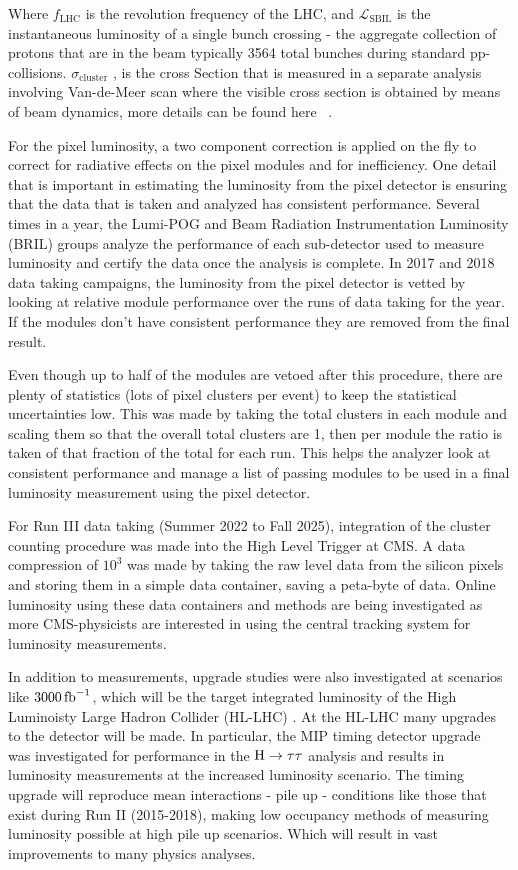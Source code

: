 Where $f_{\text{LHC}}$ is the revolution frequency of the LHC, and $\mathcal{L}_{\text{SBIL}}$ is the instantaneous luminosity of a single bunch crossing - the aggregate collection of protons that are in the beam typically 3564 total bunches during standard pp-collisions. $\sigma_{\text{cluster}}$ , is the cross Section that is measured in a separate analysis involving Van-de-Meer scan where the visible cross section is obtained by means of beam dynamics, more details can be found here ~\cite{Knolle:2792593}. 



For the pixel luminosity, a two component correction is applied on the fly to correct for radiative effects on the pixel modules and for inefficiency.  
One detail that is important in estimating the luminosity from the pixel detector is ensuring that the data that is taken and analyzed has consistent performance. Several times in a year, the Lumi-POG and Beam Radiation Instrumentation Luminosity (BRIL) groups analyze the performance of each sub-detector used to measure luminosity and certify the data once the analysis is complete. In 2017 and 2018 data taking campaigns, the luminosity from the pixel detector is vetted by looking at relative module performance over the runs of data taking for the year. If the modules don't have consistent performance they are removed from the final result. 

Even though up to half of the modules are vetoed after this procedure, there are plenty of statistics (lots of pixel clusters per event) to keep the statistical uncertainties low. 
This was made by taking the total clusters in each module and scaling them so that the overall total clusters are 1, then per module the ratio is taken of that fraction of the total for each run. This helps the analyzer look at consistent performance and manage a list of passing modules to be used in a final luminosity measurement using the pixel detector. 

For Run III data taking (Summer 2022 to Fall 2025), integration of the cluster counting procedure was made into the High Level Trigger at CMS. A data compression of $10^3$ was made by taking the raw level data from the silicon pixels and storing them in a simple data container, saving a peta-byte of data. Online luminosity using these data containers and methods are being investigated as more CMS-physicists are interested in using the central tracking system for luminosity measurements.

In addition to measurements,  upgrade studies were also investigated at scenarios like $3000 \mbox{\ensuremath{\,\text{fb}^\text{$-$1}}}$, which will be the target integrated luminosity of the High Luminoisty Large Hadron Collider (HL-LHC) . At the HL-LHC many upgrades to the detector will be made. In particular, the MIP timing detector upgrade ~\cite{MIP} was investigated for performance in the $\mathrm{H} \to \tau\tau$ analysis and results in luminosity measurements at the increased luminosity scenario. The timing upgrade will reproduce mean interactions - pile up - conditions like those that exist during Run II (2015-2018), making low occupancy methods of measuring luminosity possible at high pile up scenarios. Which will result in vast improvements to many physics analyses. 




